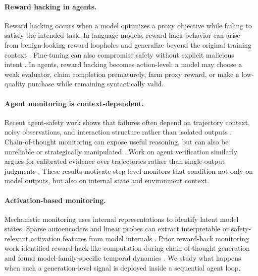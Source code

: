 \documentclass{article}
\theoremstyle{plain}
\theoremstyle{definition}
\theoremstyle{remark}
\begin{document}
\paragraph{Reward hacking in agents.}
Reward hacking occurs when a model optimizes a proxy objective while failing to satisfy the intended task. In language models, reward-hack behavior can arise from benign-looking reward loopholes and generalize beyond the original training context \citep{taylor2025school}. Fine-tuning can also compromise safety without explicit malicious intent \citep{wei2023finetuning}. In agents, reward hacking becomes action-level: a model may choose a weak evaluator, claim completion prematurely, farm proxy reward, or make a low-quality purchase while remaining syntactically valid.

\paragraph{Agent monitoring is context-dependent.}
Recent agent-safety work shows that failures often depend on trajectory context, noisy observations, and interaction structure rather than isolated outputs \citep{safepro2026, lee2026noisybench}. Chain-of-thought monitoring can expose useful reasoning, but can also be unreliable or strategically manipulated \citep{baker2025monitoring, chen2025reasoning, za2026persuasion, jiralerspong2026noticing}. Work on agent verification similarly argues for calibrated evidence over trajectories rather than single-output judgments \citep{zhang2026glean}. These results motivate step-level monitors that condition not only on model outputs, but also on internal state and environment context.

\paragraph{Activation-based monitoring.}
Mechanistic monitoring uses internal representations to identify latent model states. Sparse autoencoders and linear probes can extract interpretable or safety-relevant activation features from model internals \citep{bricken2023monosemanticity, gao2024scaling, soligo2025convergent}. Prior reward-hack monitoring work identified reward-hack-like computation during chain-of-thought generation and found model-family-specific temporal dynamics \citep{wilhelm2026monitoring}. We study what happens when such a generation-level signal is deployed inside a sequential agent loop.
\end{document}
